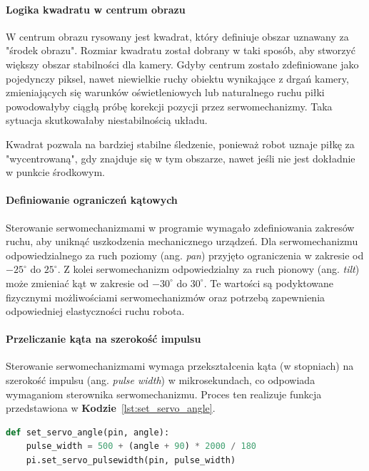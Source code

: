 \documentclass[a4paper,twoside,12pt]{book}
\begin{document}
\newpage
\paragraph{Logika kwadratu w centrum obrazu}
W centrum obrazu rysowany jest kwadrat, który definiuje obszar uznawany za "środek obrazu". Rozmiar kwadratu został dobrany w taki sposób, aby stworzyć większy obszar stabilności dla kamery. Gdyby centrum zostało zdefiniowane jako pojedynczy piksel, nawet niewielkie ruchy obiektu wynikające z drgań kamery, zmieniających się warunków oświetleniowych lub naturalnego ruchu piłki powodowałyby ciągłą próbę korekcji pozycji przez serwomechanizmy. Taka sytuacja skutkowałaby niestabilnością układu.

Kwadrat pozwala na bardziej stabilne śledzenie, ponieważ robot uznaje piłkę za "wycentrowaną", gdy znajduje się w tym obszarze, nawet jeśli nie jest dokładnie w punkcie środkowym.

\paragraph{Definiowanie ograniczeń kątowych}
Sterowanie serwomechanizmami w programie wymagało zdefiniowania zakresów ruchu, aby uniknąć uszkodzenia mechanicznego urządzeń. Dla serwomechanizmu odpowiedzialnego za ruch poziomy (ang. \textit{pan}) przyjęto ograniczenia w zakresie od $-25^{\circ}$ do $25^{\circ}$. Z kolei serwomechanizm odpowiedzialny za ruch pionowy (ang. \textit{tilt}) może zmieniać kąt w zakresie od $-30^{\circ}$ do $30^{\circ}$. Te wartości są podyktowane fizycznymi możliwościami serwomechanizmów oraz potrzebą zapewnienia odpowiedniej elastyczności ruchu robota.

\paragraph{Przeliczanie kąta na szerokość impulsu}
Sterowanie serwomechanizmami wymaga przekształcenia kąta (w stopniach) na szerokość impulsu (ang. \textit{pulse width}) w mikrosekundach, co odpowiada wymaganiom sterownika serwomechanizmu. Proces ten realizuje funkcja przedstawiona w \textbf{Kodzie}~\ref{lst:set_servo_angle}.

\begin{lstlisting}[language=Python, caption={Przeliczanie kąta na szerokość impulsu.}, label={lst:set_servo_angle}, captionpos=b]
def set_servo_angle(pin, angle):
    pulse_width = 500 + (angle + 90) * 2000 / 180
    pi.set_servo_pulsewidth(pin, pulse_width)
\end{lstlisting}
\end{document}
